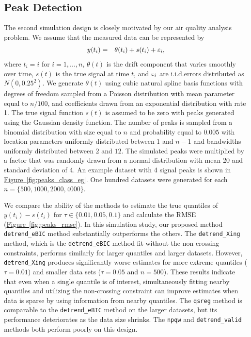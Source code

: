 \documentclass[aoas]{imsart}
\newcommand{\Fig}[1]{\hyperref[fig:#1]{Figure~\ref*{fig:#1}}} %
\newcommand{\Fig}[1]{{Figure~\ref{fig:#1}}} %
\newcommand{\VE}[2]{\MakeLowercase{#1}_{#2}} %
\begin{document}
\subsection{Peak Detection}
\label{sec:peak_detection}
The second simulation design is closely motivated by our air quality analysis problem. We assume that the measured data can be represented by
\begin{eqnarray*}
	y(t_i) & = & \theta(t_i) + s(t_i) + \VE{\varepsilon}{i},
\end{eqnarray*}
where $t_i = i$ for $i = 1, ..., n$, $\theta(t)$ is the drift component that varies smoothly over time, $s(t)$ is the true signal at time $t$, and $\VE{\varepsilon}{i}$ are i.i.d.\@ errors distributed as $N(0, 0.25^2)$. We generate $\theta(t)$ using cubic natural spline basis functions with degrees of freedom sampled from a Poisson distribution with mean parameter equal to $n/100$,  and coefficients drawn from an exponential distribution with rate 1. The true signal function $s(t)$ is assumed to be zero with peaks generated using the Gaussian density function. The number of peaks is sampled from a binomial distribution with size equal to $n$ and probability equal to $0.005$ with location parameters uniformly distributed between $1$ and $n-1$ and bandwidths uniformly distributed between $2$ and $12$. The simulated peaks were multiplied by a factor that was randomly drawn from a normal distribution with mean 20 and standard deviation of 4. An example dataset with 4 signal peaks is shown in \Fig{peaks_class_eg}. One hundred datasets were generated for each $n=\{500, 1000, 2000, 4000\}$. 

We compare the ability of the methods to estimate the true quantiles of $y(t_i)-s(t_i)$  for $\tau \in \{0.01, 0.05, 0.1\}$ and calculate the RMSE (\Fig{peaks_rmse}). In this simulation study, our proposed method \texttt{detrend\_eBIC} method substantially outperforms the others. The \texttt{detrend\_Xing} method, which is the \texttt{detrend\_eBIC} method fit without the non-crossing constraints, performs similarly for larger quantiles and larger datasets. However, \texttt{detrend\_Xing} produces significantly worse estimates for more extreme quantiles ($\tau = 0.01$) and smaller data sets ($\tau = 0.05$ and $n = 500$). These results indicate that even when a single quantile is of interest, simultaneously fitting nearby quantiles and utilizing the non-crossing constraint can improve estimates when data is sparse by using information from nearby quantiles. The \texttt{qsreg} method is comparable to the \texttt{detrend\_eBIC} method on the larger datasets, but its performance deteriorates as the data size shrinks. The \texttt{npqw} and \texttt{detrend\_valid} methods both perform poorly on this design.
\end{document}
